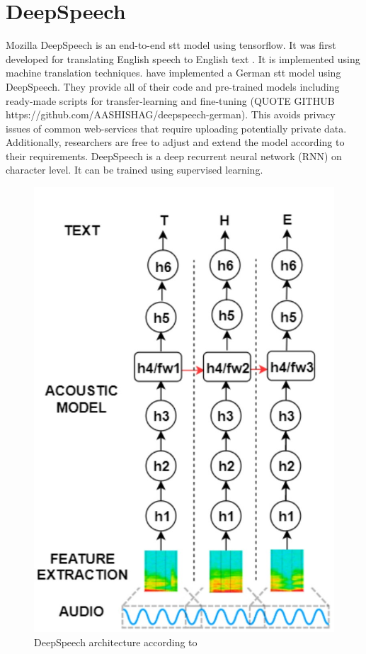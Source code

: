 \section{DeepSpeech}
Mozilla DeepSpeech is an end-to-end \gls{stt} model using tensorflow. It was first developed for translating English speech to English text \cite{Hannun2014DeepSS}. It is implemented using machine translation techniques. \citet{Agarwal2019GermanES} have implemented a German \gls{stt} model using DeepSpeech. They provide all of their code and pre-trained models including ready-made scripts for transfer-learning and fine-tuning (QUOTE GITHUB https://github.com/AASHISHAG/deepspeech-german). This avoids privacy issues of common web-services that require uploading potentially private data. Additionally, researchers are free to adjust and extend the model according to their requirements. DeepSpeech is a deep recurrent neural network (RNN) on character level. It can be trained using supervised learning. 

\begin{figure}[h]
\includegraphics[scale=0.7]{deepspeech-de}
\caption{DeepSpeech architecture according to \citet{Agarwal2019GermanES}}
\label{architecture}
\end{figure}

